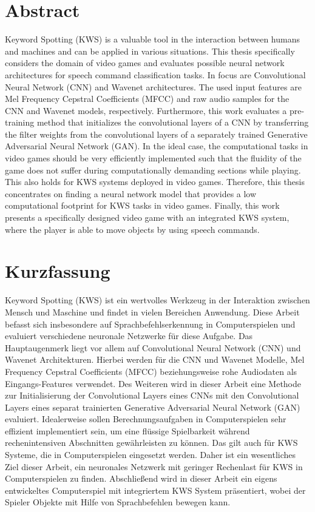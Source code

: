 
\chapter*{Abstract}\label{sec:shards_abstract}
Keyword Spotting (KWS) is a valuable tool in the interaction between humans and machines and can be applied in various situations.
This thesis specifically considers the domain of video games and evaluates possible neural network architectures for speech command classification tasks.
In focus are Convolutional Neural Network (CNN) and Wavenet architectures.
The used input features are Mel Frequency Cepstral Coefficients (MFCC) and raw audio samples for the CNN and Wavenet models, respectively.
Furthermore, this work evaluates a pre-training method that initializes the convolutional layers of a CNN by transferring the filter weights from the convolutional layers of a separately trained Generative Adversarial Neural Network (GAN).
In the ideal case, the computational tasks in video games should be very efficiently implemented such that the fluidity of the game does not suffer during computationally demanding sections while playing.
This also holds for KWS systems deployed in video games.
Therefore, this thesis concentrates on finding a neural network model that provides a low computational footprint for KWS tasks in video games.
Finally, this work presents a specifically designed video game with an integrated KWS system, where the player is able to move objects by using speech commands.



\chapter*{Kurzfassung}
Keyword Spotting (KWS) ist ein wertvolles Werkzeug in der Interaktion zwischen Mensch und Maschine und findet in vielen Bereichen Anwendung.
Diese Arbeit befasst sich insbesondere auf Sprachbefehlserkennung in Computerspielen und evaluiert verschiedene neuronale Netzwerke für diese Aufgabe.
Das Hauptaugenmerk liegt vor allem auf Convolutional Neural Network (CNN) und Wavenet Architekturen.
Hierbei werden für die CNN und Wavenet Modelle, Mel Frequency Cepstral Coefficients (MFCC) beziehungsweise rohe Audiodaten als Eingangs-Features verwendet.
Des Weiteren wird in dieser Arbeit eine Methode zur Initialisierung der Convolutional Layers eines CNNs mit den Convolutional Layers eines separat trainierten Generative Adversarial Neural Network (GAN) evaluiert.
Idealerweise sollen Berechnungsaufgaben in Computerspielen sehr effizient implementiert sein, um eine flüssige Spielbarkeit während rechenintensiven Abschnitten gewährleisten zu können.
Das gilt auch für KWS Systeme, die in Computerspielen eingesetzt werden.
Daher ist ein wesentliches Ziel dieser Arbeit, ein neuronales Netzwerk mit geringer Rechenlast für KWS in Computerspielen zu finden.
Abschließend wird in dieser Arbeit ein eigens entwickeltes Computerspiel mit integriertem KWS System präsentiert, wobei der Spieler Objekte mit Hilfe von Sprachbefehlen bewegen kann.